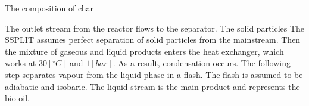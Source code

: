 \begin{table}[h!]
	\begin{subtable}[h]{0.49\textwidth}
		\centering		
		\caption{The composition of char}
		\label{tbl:Ash_Composition_Pyrolysis}
	\end{subtable}
	\caption{The composition of pyrolysis products}
\end{table}

The outlet stream from the reactor flows to the separator. The solid particles The SSPLIT assumes perfect separation of solid particles from the mainstream. Then the mixture of gaseous and liquid products enters the heat exchanger, which works at $30 [^\circ C]$ and $1 [bar]$. As a result, condensation occurs. The following step separates vapour from the liquid phase in a flash. The flash is assumed to be adiabatic and isobaric. The liquid stream is the main product and represents the bio-oil. 

